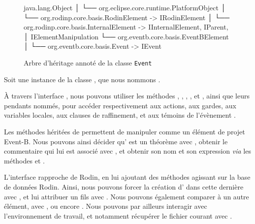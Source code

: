 \begin{figure}[H]
\centering
\begin{imtaConsole}
java.lang.Object
│
└── org.eclipse.core.runtime.PlatformObject
    │
    └── org.rodinp.core.basis.RodinElement              -> IRodinElement
        │
        └── org.rodinp.core.basis.InternalElement       -> IInternalElement, IParent,
            │                                              IElementManipulation
            └── org.eventb.core.basis.EventBElement
                │
                └── org.eventb.core.basis.Event         -> IEvent
\end{imtaConsole}
\caption{Arbre d'héritage annoté de la classe \texttt{Event}}
\label{fig:inheritanceTreeEvent}
\end{figure}

Soit une instance de la classe , que nous nommons .

À travers l'interface , nous pouvons utiliser les méthodes , , , %
, et , ainsi que leurs pendants nommés, pour accéder respectivement aux actions, aux gardes, aux variables locales, %
aux clauses de raffinement, et aux témoins de l'évènement .

Les méthodes héritées de  permettent de manipuler  comme un élément de projet Event-B.
Nous pouvons ainsi décider qu' est un théorème avec , obtenir le commentaire qui lui est associé avec , %
et obtenir son nom et son expression \textit{via} les méthodes  et .

L'interface  rapproche  de Rodin, en lui ajoutant des méthodes agissant sur la base de données Rodin.
Ainsi, nous pouvons forcer la création d' dans cette dernière avec , et lui attribuer un fils avec .
Nous pouvons également comparer  à un autre élément, avec , ou encore .
Nous pouvons par ailleurs interagir avec l'environnement de travail, et notamment récupérer le fichier courant avec .
